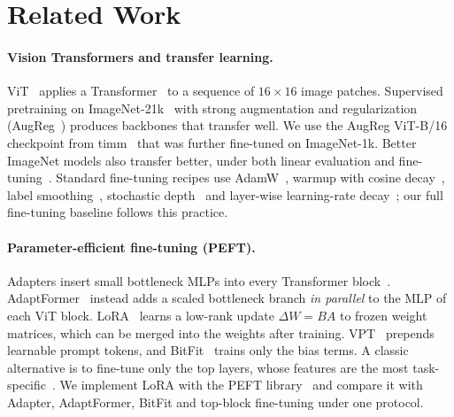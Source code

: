 \section{Related Work}
\label{sec:related}

\paragraph{Vision Transformers and transfer learning.}
ViT~\cite{dosovitskiy2021vit} applies a Transformer~\cite{vaswani2017attention} to a sequence of $16 \times 16$ image patches.
Supervised pretraining on ImageNet-21k~\cite{deng2009imagenet} with strong augmentation and regularization (AugReg~\cite{steiner2022augreg}) produces backbones that transfer well.
We use the AugReg ViT-B/16 checkpoint from timm~\cite{wightman2019timm} that was further fine-tuned on ImageNet-1k.
Better ImageNet models also transfer better, under both linear evaluation and fine-tuning~\cite{kornblith2019better}.
Standard fine-tuning recipes use AdamW~\cite{loshchilov2019adamw}, warmup with cosine decay~\cite{loshchilov2017sgdr}, label smoothing~\cite{szegedy2016rethinking}, stochastic depth~\cite{huang2016stochastic} and layer-wise learning-rate decay~\cite{bao2022beit}; our full fine-tuning baseline follows this practice.

\paragraph{Parameter-efficient fine-tuning (PEFT).}
Adapters insert small bottleneck MLPs into every Transformer block~\cite{houlsby2019adapter}.
AdaptFormer~\cite{chen2022adaptformer} instead adds a scaled bottleneck branch \emph{in parallel} to the MLP of each ViT block.
LoRA~\cite{hu2022lora} learns a low-rank update $\Delta W = BA$ to frozen weight matrices, which can be merged into the weights after training.
VPT~\cite{jia2022vpt} prepends learnable prompt tokens, and BitFit~\cite{benzaken2022bitfit} trains only the bias terms.
A classic alternative is to fine-tune only the top layers, whose features are the most task-specific~\cite{yosinski2014transferable}.
We implement LoRA with the PEFT library~\cite{mangrulkar2022peft} and compare it with Adapter, AdaptFormer, BitFit and top-block fine-tuning under one protocol.

